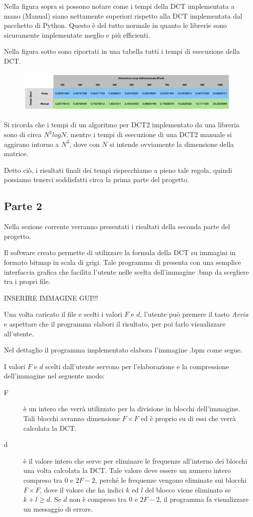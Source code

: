 \documentclass[preprint,12pt]{elsarticle}
\begin{document}
Nella figura sopra si possono notare come i tempi della DCT implementata a mano (Manual) siano nettamente superiori rispetto alla DCT implementata dal pacchetto di Python. Questo è del tutto normale in quanto le librerie sono sicuramente implementate meglio e più efficienti.

\newpage
Nella figura sotto sono riportati in una tabella tutti i tempi di esecuzione della DCT.

\begin{figure}[H]
	\centering
	\includegraphics[width=\linewidth]{tabella}
\end{figure}

Si ricorda che i tempi di un algoritmo per DCT2 implementato da una libreria sono di circa $N^2 logN$, mentre i tempi di esecuzione di una DCT2 manuale si aggirano intorno a $N^3$, dove con $N$ si intende ovviamente la dimensione della matrice.

Detto ciò, i risultati finali dei tempi rispecchiamo a pieno tale regola, quindi possiamo tenerci soddisfatti circa la prima parte del progetto. 
\subsection{Parte 2}
Nella sezione corrente verranno presentati i risultati della seconda parte del progetto.

Il software creato permette di utilizzare la formula della DCT su immagini in formato bitmap in scala di grigi.
Tale programma di presenta con una semplice interfaccia grafica che facilita l'utente nelle scelta dell'immagine .bmp da scegliere tra i propri file.

INSERIRE IMMAGINE GUI!!!

Una volta caricato il file e scelti i valori $F$ e $d$, l'utente può premere il tasto \textit{Avvia} e aspettare che il programma elabori il risultato, per poi farlo visualizzare all'utente.

Nel dettaglio il programma implementato elabora l'immagine .bpm come segue.

I valori $F$ e $d$ scelti dall'utente servono per l'elaborazione e la compressione dell'immagine nel seguente modo:
\begin{description}
\item[F] è un intero che verrà utilizzato per la divisione in blocchi dell'immagine. Tali blocchi avranno dimensione $F \times F$ ed è proprio su di essi che verrà calcolata la DCT.
\item[d] è il valore intero che serve per eliminare le frequenze all'interno dei blocchi una volta calcolata la DCT. Tale valore deve essere un numero intero compreso tra $0$ e $2F-2$, perché le frequenze vengono eliminate sui blocchi $F \times F$, dove il valore che ha indici $k$ ed $l$ del blocco viene eliminato se $k + l \geq d$. Se $d$ non è compreso tra $0$ e $2F-2$, il programma fa visualizzare un messaggio di errore.
\end{description}
\end{document}
